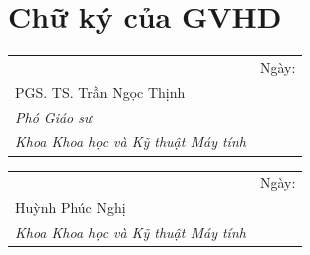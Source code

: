 \chapter*{Chữ ký của GVHD}

\vspace{2cm} %

\noindent
\begin{tabular}{p{8cm}p{4cm}}
\hrulefill & Ngày: \hrulefill \\
PGS. TS. Trần Ngọc Thịnh \\ 
\textit{Phó Giáo sư} & \\
\textit{Khoa Khoa học và Kỹ thuật Máy tính} & \\
\end{tabular}

\vspace{3cm} %

\noindent
\begin{tabular}{p{8cm}p{4cm}}
\hrulefill & Ngày: \hrulefill \\
Huỳnh Phúc Nghị \\
\textit{Khoa Khoa học và Kỹ thuật Máy tính} & \\
\end{tabular}
